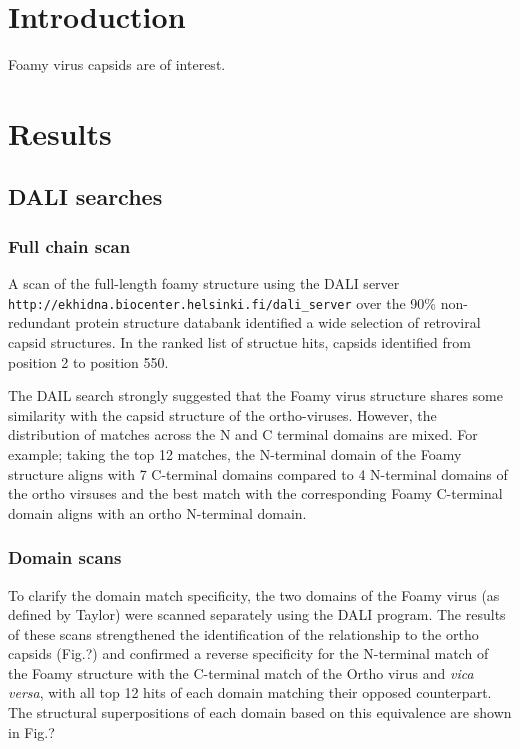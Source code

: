 \section{Introduction}
Foamy virus capsids are of interest.

\section{Results}

\subsection{DALI searches}

\subsubsection{Full chain scan}

A scan of the full-length foamy structure using the DALI server
{\tt http://ekhidna.biocenter.helsinki.fi/dali_server}
over the 90\% non-redundant protein structure databank
identified a wide selection of retroviral capsid structures.  In the ranked list of structue hits,
capsids identified from position 2 to position 550.

The DAIL search strongly suggested that the Foamy virus structure shares some similarity with the
capsid structure of the ortho-viruses.   However, the distribution of matches across the N and
C terminal domains are mixed.   For example; taking the top 12 matches, the N-terminal domain of the Foamy
structure aligns with 7 C-terminal domains compared to 4 N-terminal domains of the ortho virsuses
and the best match with the corresponding Foamy C-terminal domain aligns with an ortho N-terminal domain.

\subsubsection{Domain scans}

To clarify the domain match specificity, the two domains of the Foamy virus (as defined by Taylor) 
were scanned separately using the DALI program.   The results of these scans strengthened the identification
of the relationship to the ortho capsids (Fig.?) and confirmed a reverse specificity for the N-terminal
match of the Foamy structure with the C-terminal match of the Ortho virus and {\em vica versa}, with all
top 12 hits of each domain matching their opposed counterpart.
The structural superpositions of each domain based on this equivalence are shown in Fig.?

